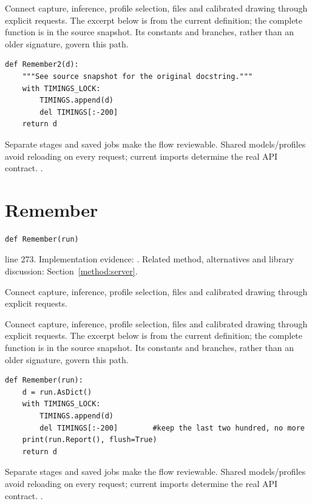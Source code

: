 Connect capture, inference, profile selection, files and calibrated drawing through explicit requests. The excerpt below is from the current definition; the complete function is in the source snapshot. Its constants and branches, rather than an older signature, govern this path.


\begin{lstlisting}[style=plain]
def Remember2(d):
    """See source snapshot for the original docstring."""
    with TIMINGS_LOCK:
        TIMINGS.append(d)
        del TIMINGS[:-200]
    return d
\end{lstlisting}
Separate stages and saved jobs make the flow reviewable. Shared models/profiles avoid reloading on every request; current imports determine the real API contract. \cite{flaskdocs,pillowops,code2026}.


\section{Remember}\label{fn:web-server:Remember}
\begin{lstlisting}[style=sig]
def Remember(run)
\end{lstlisting}
 line 273. Implementation evidence: \cite{code2026}. Related method, alternatives and library discussion: Section~\ref{method:server}.


Connect capture, inference, profile selection, files and calibrated drawing through explicit requests.


Connect capture, inference, profile selection, files and calibrated drawing through explicit requests. The excerpt below is from the current definition; the complete function is in the source snapshot. Its constants and branches, rather than an older signature, govern this path.


\begin{lstlisting}[style=plain]
def Remember(run):
    d = run.AsDict()
    with TIMINGS_LOCK:
        TIMINGS.append(d)
        del TIMINGS[:-200]        #keep the last two hundred, no more
    print(run.Report(), flush=True)
    return d
\end{lstlisting}
Separate stages and saved jobs make the flow reviewable. Shared models/profiles avoid reloading on every request; current imports determine the real API contract. \cite{flaskdocs,pillowops,code2026}.


